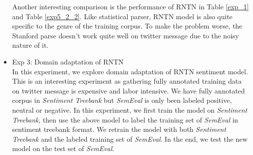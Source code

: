 \begin{itemize}
Another interesting comparison is the performance of RNTN in Table \ref{exp_1} and Table \ref{exp5_2_2}. Like statistical parser, RNTN model is also quite specific to the genre of the training corpus. To make the problem worse, the Stanford parse doesn't work quite well on twitter message due to the noisy nature of it. 

\item Exp 3: Domain adaptation of RNTN\\
In this experiment, we explore domain adaptation of RNTN sentiment model. This is an interesting experiment as gathering fully annotated training data on twitter message is expensive and labor intensive. We have fully annotated corpus in \textit{Sentiment Treebank} but \textit{SemEval} is only been labeled positive, neutral or negative. In this experiment, we first train the model on \textit{Sentiment Treebank}, then use the above model to label the training set of \textit{SemEval} in sentiment treebank format. We retrain the model with both \textit{Sentiment Treebank} and the labeled  training set of \textit{SemEval}. In the end, we test the new model on the test set of \textit{SemEval}.






\end{itemize}
